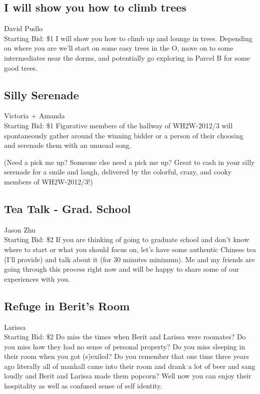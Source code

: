 \documentclass[11pt]{article}
\begin{document}
\subsection{I will show you how to climb trees}
David Pudlo
\\
Starting Bid: \$1
\newline
I will show you how to climb up and lounge in trees. Depending on where you are we'll start on some easy trees in the O, move on to some intermediates near the dorms, and potentially go exploring in Parcel B for some good trees.
\subsection{Silly Serenade}
Victoria + Amanda
\\
Starting Bid: \$1
\newline
Figurative members of the hallway of WH2W-2012/3 will spontaneously gather around the winning bidder or a person of their choosing and serenade them with an unusual song.

(Need a pick me up?  Someone else need a pick me up?  Great to cash in your silly serenade for a smile and laugh, delivered by the colorful, crazy, and cooky members of WH2W-2012/3!)
\subsection{Tea Talk - Grad. School}
Jason Zhu
\\
Starting Bid: \$2
\newline
If you are thinking of going to graduate school and don't know where to start or what you should focus on, let's have some authentic Chinese tea (I'll provide) and talk about it (for 30 minutes minimum). Me and my friends are going through this process right now and will be happy to share some of our experiences with you.
\subsection{Refuge in Berit's Room}
Larissa
\\
Starting Bid: \$2
\newline
Do miss the times when Berit and Larissa were roomates? Do you miss how they had no sense of personal property? Do you miss sleeping in their room when you got (s)exiled? Do you remember that one time three years ago literally all of manhall came into their room and drank a lot of beer and sang loudly and Berit and Larissa made them popcorn? 
Well now you can enjoy their hospitality as well as confused sense of self identity. 
\end{document}
